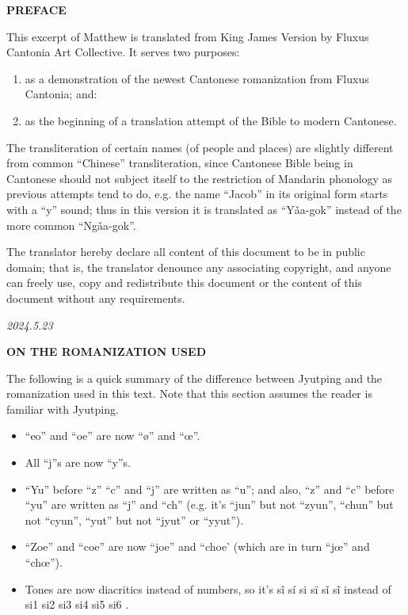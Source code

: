 \documentclass[twoside,twocolumn,a4paper,10pt]{memoir}
\begin{document}
	
	\begin{center} \large \textbf{PREFACE}\normalsize\end{center}
	
	This excerpt of Matthew is translated from King James Version by Fluxus Cantonia Art Collective. It serves two purposes:
	\begin{enumerate}
		\item as a demonstration of 
		the newest Cantonese romanization from Fluxus Cantonia; and:
		\item as the beginning of a translation attempt of the Bible to modern Cantonese.
	\end{enumerate}
	
	The transliteration of certain names (of people and places) are slightly different from common ``Chinese'' transliteration, since Cantonese Bible being in Cantonese should not subject itself to the restriction of Mandarin phonology as previous attempts tend to do, e.g. the name ``Jacob'' in its original form starts with a ``y'' sound; thus in this version it is translated as ``Y\v{a}a-gok'' instead of the more common ``Ng\v{a}a-gok''.
	
	The translator hereby declare all content of this document to be in public domain; that is, the translator denounce any associating copyright, and anyone can freely use, copy and redistribute this document or the content of this document without any requirements.
	
	\begin{flushright}
		\textit{2024.5.23}
	\end{flushright}
	
	\begin{center} \large \textbf{ON THE ROMANIZATION USED} \normalsize \end{center}
	The following is a quick summary of the difference between Jyutping and the romanization used in this text. Note that this section assumes the reader is familiar with Jyutping.
	
	\begin{itemize}
		\item ``eo'' and ``oe'' are now ``ø'' and ``œ''.
		\item All ``j''s are now ``y''s.
		\item ``Yu'' before ``z'' ``c'' and ``j'' are written as ``u''; and also, ``z'' and ``c'' before ``yu'' are written as ``j'' and ``ch'' (e.g. it's ``jun'' but not ``zyun'', ``chun'' but not ``cyun'', ``yut'' but not ``jyut'' or ``yyut'').
		\item ``Zoe'' and ``coe'' are now ``joe'' and ``choe' (which are in turn ``jœ'' and ``chœ'').
		\item Tones are now diacritics instead of numbers, so it's \Large sî  sí si sï sǐ sĩ \normalsize instead of \Large si1 si2 si3 si4 si5 si6 \normalsize.
	\end{itemize}
\end{document}
